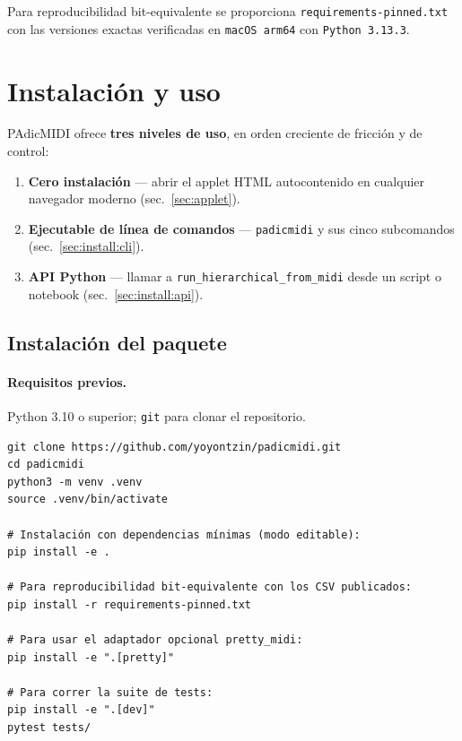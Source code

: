 \documentclass[11pt,a4paper,oneside]{article}
\theoremstyle{plain}
\theoremstyle{definition}
\theoremstyle{remark}
\newcommand{\code}[1]{\texttt{\small #1}}
\begin{document}
Para reproducibilidad bit-equivalente se proporciona
\code{requirements-pinned.txt} con las versiones exactas verificadas en
\code{macOS arm64} con \code{Python 3.13.3}.

\section{Instalación y uso}\label{sec:install}

PAdicMIDI ofrece \textbf{tres niveles de uso}, en orden creciente de
fricción y de control:

\begin{enumerate}[itemsep=4pt]
  \item \textbf{Cero instalación} --- abrir el applet HTML
        autocontenido en cualquier navegador moderno (sec.~\ref{sec:applet}).
  \item \textbf{Ejecutable de línea de comandos} ---
        \code{padicmidi} y sus cinco subcomandos
        (sec.~\ref{sec:install:cli}).
  \item \textbf{API Python} --- llamar a \code{run\_hierarchical\_from\_midi}
        desde un script o notebook (sec.~\ref{sec:install:api}).
\end{enumerate}

\subsection{Instalación del paquete}\label{sec:install:pkg}

\paragraph{Requisitos previos.} Python 3.10 o superior; \code{git} para
clonar el repositorio.

\begin{lstlisting}[style=shell]
git clone https://github.com/yoyontzin/padicmidi.git
cd padicmidi
python3 -m venv .venv
source .venv/bin/activate

# Instalación con dependencias mínimas (modo editable):
pip install -e .

# Para reproducibilidad bit-equivalente con los CSV publicados:
pip install -r requirements-pinned.txt

# Para usar el adaptador opcional pretty_midi:
pip install -e ".[pretty]"

# Para correr la suite de tests:
pip install -e ".[dev]"
pytest tests/
\end{lstlisting}
\end{document}

